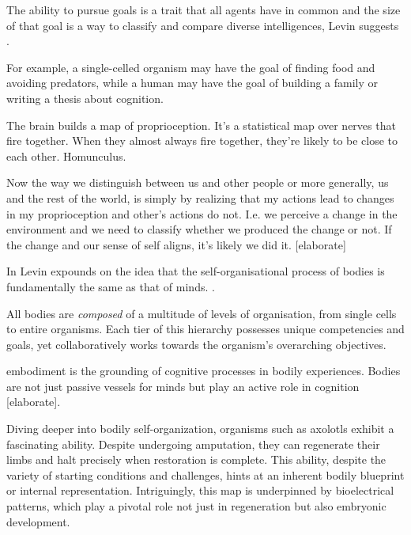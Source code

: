 The ability to pursue goals is a trait that all agents have in common and the size of that goal is a way to classify and compare diverse intelligences, Levin suggests \cite{Levin_2022, levin_computational_2019}.

For example, a single-celled organism may have the goal of finding food and avoiding predators, while a human may have the goal of building a family or writing a thesis about cognition.

The brain builds a map of proprioception. It's a statistical map over nerves that fire together. When they almost always fire together, they're likely to be close to each other. Homunculus.

Now the way we distinguish between us and other people or more generally, us and the rest of the world, is simply by realizing that my actions lead to changes in my proprioception and other's actions do not. I.e. we perceive a change in the environment and we need to classify whether we produced the change or not. If the change and our sense of self aligns, it's likely we did it.  [elaborate]

In  Levin expounds on the idea that the self-organisational process of bodies is fundamentally the same as that of minds.
. 

All bodies are \emph{composed} of a multitude of levels of organisation, from single cells to entire organisms. Each tier of this hierarchy possesses unique competencies and goals, yet collaboratively works towards the organism's overarching objectives.

\Gls{embodiment} is the grounding of cognitive processes in bodily experiences. Bodies are not just passive vessels for minds but play an active role in cognition  [elaborate]. 

Diving deeper into bodily self-organization, organisms such as axolotls exhibit a fascinating ability. Despite undergoing amputation, they can regenerate their limbs and halt precisely when restoration is complete. This ability, despite the variety of starting conditions and challenges, hints at an inherent bodily blueprint or internal representation. Intriguingly, this map is underpinned by bioelectrical patterns, which play a pivotal role not just in regeneration but also embryonic development.

